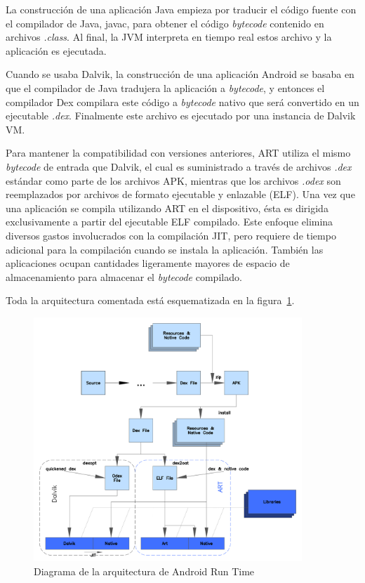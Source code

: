 \begin{description}
  La construcción de una aplicación Java empieza por traducir el código fuente
  con el compilador de Java, javac, para obtener el código \textit{bytecode}
  contenido en archivos \textit{.class}. Al final, la JVM interpreta en tiempo
  real estos archivo y la aplicación es ejecutada.

  Cuando se usaba Dalvik, la construcción de una aplicación Android se basaba en
  que el compilador de Java tradujera la aplicación a \textit{bytecode}, y
  entonces el compilador Dex compilara este código a \textit{bytecode} nativo que
  será convertido en un ejecutable \textit{.dex}. Finalmente este archivo es
  ejecutado por una instancia de Dalvik VM.
  
  Para mantener la compatibilidad con versiones anteriores, ART utiliza el mismo
  \textit{bytecode} de entrada que Dalvik, el cual es suministrado a través de
  archivos \textit{.dex} estándar como parte de los archivos \ac{APK}, mientras
  que los archivos \textit{.odex} son reemplazados por archivos de formato
  ejecutable y enlazable (ELF). Una vez que una aplicación se compila utilizando
  ART en el dispositivo, ésta es dirigida exclusivamente a partir del ejecutable
  ELF compilado. Este enfoque elimina diversos gastos involucrados con la
  compilación JIT, pero requiere de tiempo adicional para la compilación cuando
  se instala la aplicación. También las aplicaciones ocupan cantidades
  ligeramente mayores de espacio de almacenamiento para almacenar el
  \textit{bytecode} compilado.

  Toda la arquitectura comentada está esquematizada en la
  figura~\ref{fig:arquitectura-art}.   

\begin{figure}[htbp]
  \centering
  \includegraphics[width=0.9\textwidth]{cap5/img/ART}
  \caption{Diagrama de la arquitectura de Android Run Time}
  \label{fig:arquitectura-art}
\end{figure}
\end{description}


